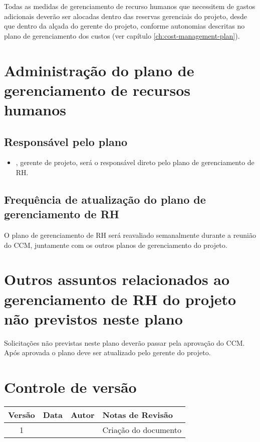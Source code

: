 Todas as medidas de gerenciamento de recurso humanos que necessitem de gastos adicionais deverão ser alocadas dentro das reservas gerenciais do projeto, desde que dentro da alçada do gerente do projeto, conforme autonomias descritas no plano de gerenciamento dos custos (ver capítulo \ref{ch:cost-management-plan}). 

\section{Administração do plano de gerenciamento de recursos humanos}

\subsection{Responsável pelo plano}

\begin{itemize}
	\item \projectManagerName{}, gerente de projeto, será o responsável direto pelo plano de gerenciamento de RH.
\end{itemize}

\subsection{Frequência de atualização do plano de gerenciamento de RH}

O plano de gerenciamento de RH será reavaliado semanalmente durante a reunião do CCM, juntamente com os outros planos de gerenciamento do projeto.

\section{Outros assuntos relacionados ao gerenciamento de RH do projeto não previstos neste plano}

Solicitações não previstas neste plano deverão passar pela aprovação do CCM. Após aprovada o plano deve ser atualizado pelo gerente do projeto.

\section{Controle de versão}

\begin{table}[H]
	\begin{tabularx}{\textwidth}{| c | c | X | X |}
		\hline
		\textbf{Versão} & \textbf{Data} & \textbf{Autor}        & \textbf{Notas de Revisão} \\
		\hline
		1                &               & \projectManagerName{} & Criação do documento     \\
		\hline
	\end{tabularx}
	\centering
\end{table}

